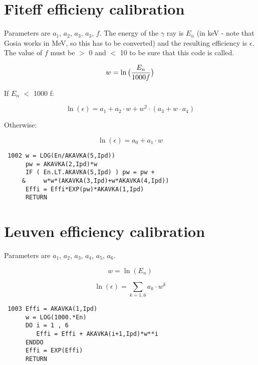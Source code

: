 \section{Fiteff efficieny calibration}

Parameters are $a_1$, $a_2$, $a_3$, $a_3$, $f$. The energy of the $\gamma$
ray is $E_n$ (in keV - note that Gosia works in MeV, so this has to be
converted) and the resulting efficiency is $\epsilon$. The value of $f$ must
be $>$ 0 and $<$ 10 to be sure that this code is called.

\begin{equation}
w = \ln\big({E_n \over 1000 f}\big)
\end{equation}

If $E_n$ $<$ 1000 f:

\begin{equation}
\ln(\epsilon) = a_1 + a_2 \cdot w + w^2 \cdot (a_3 + w \cdot a_4)
\end{equation}

Otherwise:

\begin{equation}
\ln(\epsilon) = a_0 + a_1 \cdot w
\end{equation}

\begin{verbatim}
 1002 w = LOG(En/AKAVKA(5,Ipd))
      pw = AKAVKA(2,Ipd)*w
      IF ( En.LT.AKAVKA(5,Ipd) ) pw = pw +
     &     w*w*(AKAVKA(3,Ipd)+w*AKAVKA(4,Ipd))
      Effi = Effi*EXP(pw)*AKAVKA(1,Ipd)
      RETURN
\end{verbatim}

\section{Leuven efficiency calibration}

Parameters are $a_1$, $a_2$, $a_3$, $a_4$, $a_5$, $a_6$.

\begin{equation}
w = \ln(E_n)
\end{equation}

\begin{equation}
\ln(\epsilon) = \sum_{k=1,6} a_k \cdot w^k
\end{equation}


\begin{verbatim}
 1003 Effi = AKAVKA(1,Ipd)
      w = LOG(1000.*En)
      DO i = 1 , 6
         Effi = Effi + AKAVKA(i+1,Ipd)*w**i
      ENDDO
      Effi = EXP(Effi)
      RETURN
\end{verbatim}

